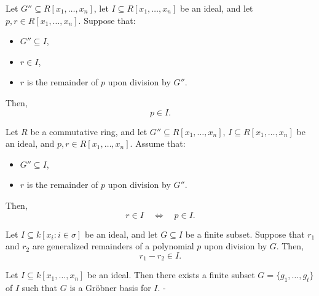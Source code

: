 \begin{lemma}\label{MonomialOrder.mem_ideal_of_remainder_mem_ideal}
  \leanok
  Let \( G'' \subseteq R[x_1, \dots, x_n] \), let \( I \subseteq R[x_1, \dots, x_n] \) be an ideal,
and let \( p, r \in R[x_1, \dots, x_n] \). Suppose that:
\begin{itemize}
\item \( G'' \subseteq I \),
\item \( r \in I \),
\item \( r \) is the remainder of \( p \) upon division by \( G'' \).
\end{itemize}
Then,
\[
p \in I.
\]

\end{lemma}

\begin{lemma}\label{MonomialOrder.remainder_mem_ideal_iff}
  \leanok
  Let \( R \) be a commutative ring, and let \( G'' \subseteq R[x_1, \dots, x_n] \), \( I \subseteq R[x_1, \dots, x_n] \) be an ideal, and \( p, r \in R[x_1, \dots, x_n] \).
Assume that:
\begin{itemize}
\item \( G'' \subseteq I \),
\item \( r \) is the remainder of \( p \) upon division by \( G'' \).
\end{itemize}
Then,
\[
r \in I \quad \Longleftrightarrow \quad p \in I.
\]

\end{lemma}

\begin{lemma}\label{MonomialOrder.remainder_sub_remainder_mem_ideal}
  \leanok
  Let \( I \subseteq k[x_i : i \in \sigma] \) be an ideal, and let \( G \subseteq I \) be a finite subset.
Suppose that \( r_1 \) and \( r_2 \) are generalized remainders of a polynomial \( p \) upon division by \( G \).
Then,
\[
r_1 - r_2 \in I.
\]

\end{lemma}

\begin{lemma}\label{MonomialOrder.exists_groebner_basis}
  \leanok
  Let \( I \subseteq k[x_1, \ldots, x_n] \) be an ideal. Then there exists a finite subset \( G = \{g_1, \ldots, g_t\} \) of \( I \) such that \( G \) is a Gröbner basis for \( I \).
-
\end{lemma}

